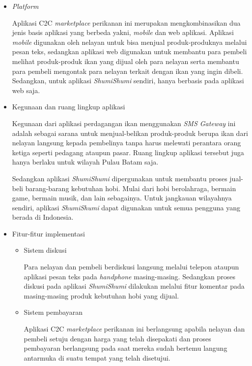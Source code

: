 \documentclass[a4paper]{article}
\begin{document}
\begin{enumerate}
    \begin{itemize}
        \item \textit{Platform}

        Aplikasi C2C \textit{marketplace} perikanan ini merupakan mengkombinasikan dua jenis basis aplikasi yang berbeda yakni, \textit{mobile} dan web aplikasi. Aplikasi \textit{mobile} digunakan oleh nelayan untuk bisa menjual produk-produknya melalui pesan teks, sedangkan aplikasi web digunakan untuk membantu para pembeli melihat produk-produk ikan yang dijual oleh para nelayan serta membantu para pembeli mengontak para nelayan terkait dengan ikan yang ingin dibeli\autocite{c2c-fish-marketplace}. Sedangkan, untuk aplikasi \textit{ShumiShumi} sendiri, hanya berbasis pada aplikasi web saja.

        \item Kegunaan dan ruang lingkup aplikasi

        Kegunaan dari aplikasi perdagangan ikan menggunakan \textit{SMS Gateway} ini adalah sebagai sarana untuk menjual-belikan produk-produk berupa ikan dari nelayan langsung kepada pembelinya tanpa harus melewati perantara orang ketiga seperti pedagang ataupun pasar. Ruang lingkup aplikasi tersebut juga hanya berlaku untuk wilayah Pulau Batam saja\autocite{c2c-fish-marketplace}.

        Sedangkan aplikasi \textit{ShumiShumi} dipergunakan untuk membantu proses jual-beli barang-barang kebutuhan hobi. Mulai dari hobi berolahraga, bermain game, bermain musik, dan lain sebagainya. Untuk jangkauan wilayahnya sendiri, aplikasi \textit{ShumiShumi} dapat digunakan untuk semua pengguna yang berada di Indonesia.

        \item Fitur-fitur implementasi

        \begin{itemize}
            \item Sistem diskusi

            Para nelayan dan pembeli berdiskusi langsung melalui telepon ataupun aplikasi pesan teks pada \textit{handphone} masing-masing\autocite{c2c-fish-marketplace}. Sedangkan proses diskusi pada aplikasi \textit{ShumiShumi} dilakukan melalui fitur komentar pada masing-masing produk kebutuhan hobi yang dijual.

            \item Sistem pembayaran

            Aplikasi C2C \textit{marketplace} perikanan ini berlangsung apabila nelayan dan pembeli setuju dengan harga yang telah disepakati dan proses pembayaran berlangsung pada saat mereka sudah bertemu langung antarmuka di suatu tempat yang telah disetujui\autocite{c2c-fish-marketplace}.


\end{itemize}
\end{itemize}
\end{enumerate}
\end{document}
